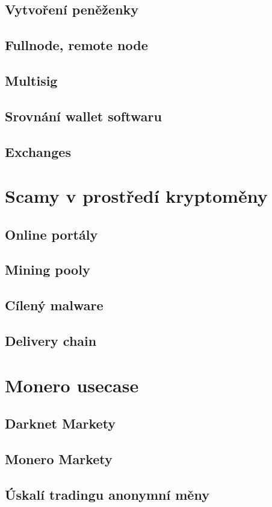 \documentclass[
  printed, %
  table,   %
  nolof,     %
  nolot,     %
           oneside, color
]{fithesis3}
\begin{document}
\subsection{Vytvoření peněženky}
\subsection{Fullnode, remote node}
\subsection{Multisig}
\subsection{Srovnání wallet softwaru}
\subsection{Exchanges}
\section{Scamy v prostředí kryptoměny}
\subsection{Online portály}
\subsection{Mining pooly}
\subsection{Cílený malware}
\subsection{Delivery chain}

\section{Monero usecase}
\subsection{Darknet Markety}
\subsection{Monero Markety}
\subsection{Úskalí tradingu anonymní měny}
\end{document}

